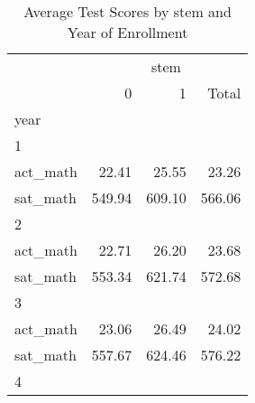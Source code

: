 \begin{table}[!h]
\caption{Average Test Scores by stem and Year of Enrollment}
\centering
\begin{tabular}{llll}
\cline{1-4}
\multicolumn{1}{c}{} &
  \multicolumn{3}{|c}{stem} \\
\multicolumn{1}{c}{} &
  \multicolumn{1}{|r}{0} &
  \multicolumn{1}{r}{1} &
  \multicolumn{1}{r}{Total} \\
\cline{1-4}
\multicolumn{1}{l}{year} &
  \multicolumn{1}{|r}{} &
  \multicolumn{1}{r}{} &
  \multicolumn{1}{r}{} \\
\multicolumn{1}{l}{\hspace{1em}1} &
  \multicolumn{1}{|r}{} &
  \multicolumn{1}{r}{} &
  \multicolumn{1}{r}{} \\
\multicolumn{1}{l}{\hspace{2em}act\_math} &
  \multicolumn{1}{|r}{22.41} &
  \multicolumn{1}{r}{25.55} &
  \multicolumn{1}{r}{23.26} \\
\multicolumn{1}{l}{\hspace{2em}sat\_math} &
  \multicolumn{1}{|r}{549.94} &
  \multicolumn{1}{r}{609.10} &
  \multicolumn{1}{r}{566.06} \\
\multicolumn{1}{l}{\hspace{1em}2} &
  \multicolumn{1}{|r}{} &
  \multicolumn{1}{r}{} &
  \multicolumn{1}{r}{} \\
\multicolumn{1}{l}{\hspace{2em}act\_math} &
  \multicolumn{1}{|r}{22.71} &
  \multicolumn{1}{r}{26.20} &
  \multicolumn{1}{r}{23.68} \\
\multicolumn{1}{l}{\hspace{2em}sat\_math} &
  \multicolumn{1}{|r}{553.34} &
  \multicolumn{1}{r}{621.74} &
  \multicolumn{1}{r}{572.68} \\
\multicolumn{1}{l}{\hspace{1em}3} &
  \multicolumn{1}{|r}{} &
  \multicolumn{1}{r}{} &
  \multicolumn{1}{r}{} \\
\multicolumn{1}{l}{\hspace{2em}act\_math} &
  \multicolumn{1}{|r}{23.06} &
  \multicolumn{1}{r}{26.49} &
  \multicolumn{1}{r}{24.02} \\
\multicolumn{1}{l}{\hspace{2em}sat\_math} &
  \multicolumn{1}{|r}{557.67} &
  \multicolumn{1}{r}{624.46} &
  \multicolumn{1}{r}{576.22} \\
\multicolumn{1}{l}{\hspace{1em}4} &
  \multicolumn{1}{|r}{} &
  \multicolumn{1}{r}{} &

\end{tabular}
\end{table}
